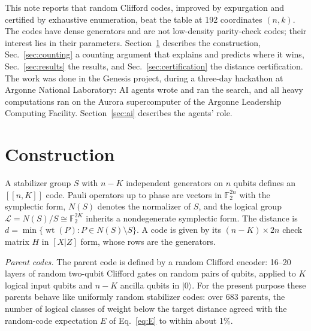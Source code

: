 \documentclass[reprint,pra,superscriptaddress,nofootinbib]{revtex4-2}
\newcommand{\F}{\mathbb{F}_2}
\newcommand{\wt}{\operatorname{wt}}
\begin{document}
This note reports that random Clifford codes, improved by expurgation and certified by exhaustive enumeration, beat
the table at 192 coordinates $(n,k)$. The codes have dense generators and are not low-density parity-check codes; their
interest lies in their parameters. Section~\ref{sec:construction} describes the construction,
Sec.~\ref{sec:counting} a counting argument that explains and predicts where it wins, Sec.~\ref{sec:results} the
results, and Sec.~\ref{sec:certification} the distance certification. The work was done in the Genesis project, during
a three-day hackathon at Argonne National Laboratory: AI agents wrote and ran the search, and all heavy computations
ran on the Aurora supercomputer of the Argonne Leadership Computing Facility. Section~\ref{sec:ai} describes the agents'
role.

\section{Construction}\label{sec:construction}

A stabilizer group $S$ with $n-K$ independent generators on $n$ qubits defines an $[[n,K]]$ code. Pauli operators up
to phase are vectors in $\F^{2n}$ with the symplectic form, $N(S)$ denotes the normalizer of $S$, and the logical group
$\mathcal{L}=N(S)/S\cong\F^{2K}$ inherits a nondegenerate symplectic form. The distance is
$d=\min\{\wt(P):P\in N(S)\setminus S\}$. A code is given by its $(n-K)\times 2n$ check matrix $H$ in $[X|Z]$ form,
whose rows are the generators.

\emph{Parent codes.} The parent code is defined by a random Clifford encoder: 16--20 layers of random two-qubit
Clifford gates on random pairs of qubits, applied to $K$ logical input qubits and $n-K$ ancilla qubits in $|0\rangle$.
For the present purpose these parents behave like uniformly random stabilizer codes: over 683 parents, the number of
logical classes of weight below the target distance agreed with the random-code expectation $E$ of Eq.~\eqref{eq:E}
to within about 1\%.
\end{document}
